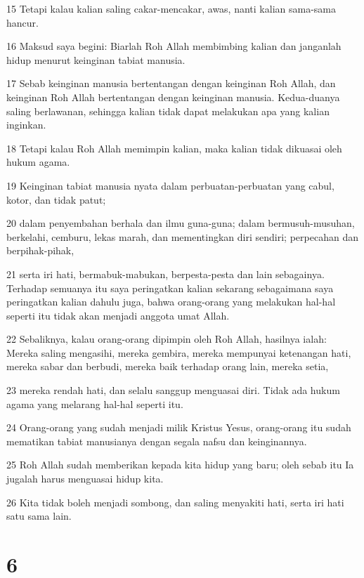 \par 15 Tetapi kalau kalian saling cakar-mencakar, awas, nanti kalian sama-sama hancur.
\par 16 Maksud saya begini: Biarlah Roh Allah membimbing kalian dan janganlah hidup menurut keinginan tabiat manusia.
\par 17 Sebab keinginan manusia bertentangan dengan keinginan Roh Allah, dan keinginan Roh Allah bertentangan dengan keinginan manusia. Kedua-duanya saling berlawanan, sehingga kalian tidak dapat melakukan apa yang kalian inginkan.
\par 18 Tetapi kalau Roh Allah memimpin kalian, maka kalian tidak dikuasai oleh hukum agama.
\par 19 Keinginan tabiat manusia nyata dalam perbuatan-perbuatan yang cabul, kotor, dan tidak patut;
\par 20 dalam penyembahan berhala dan ilmu guna-guna; dalam bermusuh-musuhan, berkelahi, cemburu, lekas marah, dan mementingkan diri sendiri; perpecahan dan berpihak-pihak,
\par 21 serta iri hati, bermabuk-mabukan, berpesta-pesta dan lain sebagainya. Terhadap semuanya itu saya peringatkan kalian sekarang sebagaimana saya peringatkan kalian dahulu juga, bahwa orang-orang yang melakukan hal-hal seperti itu tidak akan menjadi anggota umat Allah.
\par 22 Sebaliknya, kalau orang-orang dipimpin oleh Roh Allah, hasilnya ialah: Mereka saling mengasihi, mereka gembira, mereka mempunyai ketenangan hati, mereka sabar dan berbudi, mereka baik terhadap orang lain, mereka setia,
\par 23 mereka rendah hati, dan selalu sanggup menguasai diri. Tidak ada hukum agama yang melarang hal-hal seperti itu.
\par 24 Orang-orang yang sudah menjadi milik Kristus Yesus, orang-orang itu sudah mematikan tabiat manusianya dengan segala nafsu dan keinginannya.
\par 25 Roh Allah sudah memberikan kepada kita hidup yang baru; oleh sebab itu Ia jugalah harus menguasai hidup kita.
\par 26 Kita tidak boleh menjadi sombong, dan saling menyakiti hati, serta iri hati satu sama lain.

\chapter{6}

